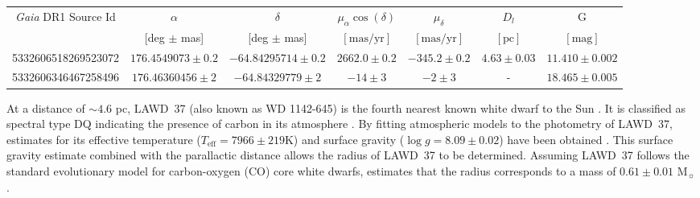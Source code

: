\documentclass[fleqn,usenatbib]{mnras}
\newcommand{\Gaia}{{\it Gaia }}
\begin{document}
\begin{table*}
 \caption{Lens LAWD~37 (first row) and source (second row) data. Proper motions of the lens and source are from the TGAS \citep{GaiaA,GaiaB,GaiaAstrometry} and HSOY \citep{HSOY2017} catalogues respectively. The coordinates ($\alpha,\delta$) are from the \Gaia DR1 source catalogue, on the ICRF and at epoch 2015.0 Julian years. Distance to the lens $D_{l}$ is obtained by inverting the lens parallax of $215.8\pm0.2$ mas from TGAS. G is the {\it Gaia} G band magnitude.}
 \label{tab:LensSourceData}
 \begin{tabular}{ccccccc}
  \hline
  \Gaia DR1 Source Id & $\alpha$ & $\delta$ &$\mu_{\alpha}\cos(\delta)$ & $\mu_{\delta}$ & $D_{l}$ & G  \\ 
                           & [deg $\pm$ mas] & [deg $\pm$ mas] &$[\text{mas/yr}]$ & $[\text{mas/yr}]$ & $[\text{pc}]$ & $[\text{mag}]$ \\
  \hline
  5332606518269523072 & $176.4549073\pm0.2$ &  $-64.84295714\pm0.2$ & $2662.0\pm 0.2$  &  $-345.2\pm 0.2$ & $4.63\pm0.03$ &$11.410\pm0.002$ \\
5332606346467258496 & $176.46360456\pm2$ &$-64.84329779\pm2$ &  $-14\pm3$& $-2\pm3$ & - & $18.465\pm0.005$ \\
  \hline
 \end{tabular}
 \label{tab:astrometricdata}
\end{table*}

At a distance of $\sim4.6$ pc, LAWD~37 (also known as WD 1142-645) is the fourth nearest known white dwarf to the Sun \citep{Sion2009}. It is classified as spectral type DQ indicating the presence of carbon in its atmosphere \citep{Koester1982}. By fitting atmospheric models \citep{Dufour2005} to the photometry of LAWD~37, estimates for its effective temperature ($T_{\text{eff}}=7966\pm219$K) and surface gravity ($\log g = 8.09\pm0.02$) have been obtained \citep{Giammichele2012}. This surface gravity estimate combined with the parallactic distance allows the radius of LAWD~37 to be determined. Assuming LAWD~37 follows the standard evolutionary model for carbon-oxygen (CO) core white dwarfs, \cite{Giammichele2012} estimates that the radius corresponds to a mass of $0.61\pm0.01$ M$_{\sun}$.
\end{document}

